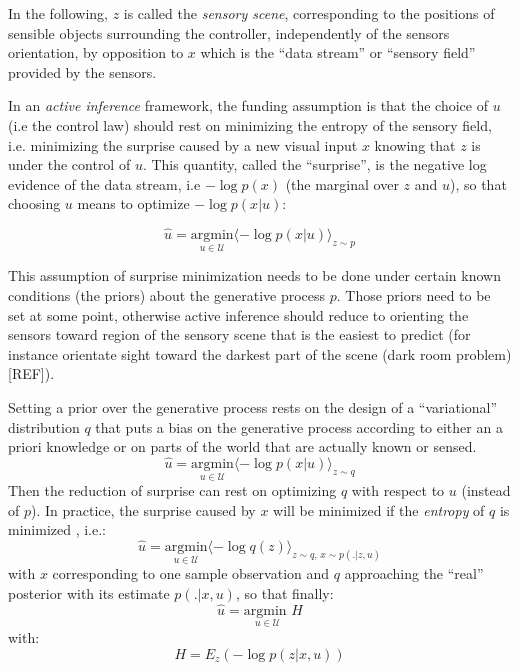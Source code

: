 \documentclass[12pt,twoside,openright]{article}
\begin{document}
	In the following, $z$ is called the \emph{sensory scene}, corresponding to the positions of sensible objects surrounding the controller, independently of the sensors orientation, by opposition to $x$ which is the ``data stream'' or ``sensory field'' provided by the sensors.
	
	In an \emph{active inference} framework, the funding assumption is that the choice of $u$ (i.e the control law) should rest on minimizing the entropy of the sensory field, i.e. minimizing the surprise caused by a new visual input $x$ knowing that $z$ is under the control of $u$. This quantity, called the ``surprise'', is the negative log evidence of the data stream, i.e $-\log p(x)$ (the marginal over $z$ and $u$), so that choosing $u$ means to optimize $-\log p(x|u)$:
	
	$$ \hat{u} = \underset{u \in \mathcal{U}}{\text{argmin}} \langle -\log p(x|u)\rangle_{z\sim p}$$
	
	{\color{blue} This assumption of surprise minimization needs to be done under certain known conditions (the priors) about the generative process $p$. Those priors need to be set at some point, otherwise active inference should reduce to orienting the sensors toward region of the sensory scene that is the easiest to predict  (for instance orientate sight toward the darkest  part of the scene (dark room problem) [REF]). }
	
	
	Setting a prior over the generative process rests on the design of a ``variational'' distribution $q$ that puts a bias on the generative process according to either an a priori knowledge or on parts of the world that are actually known or sensed.
	$$ \hat{u} = \underset{u \in \mathcal{U}}{\text{argmin}} \langle -\log p(x|u)\rangle_{z\sim q}$$ 
	Then the reduction of surprise can rest on optimizing $q$ with respect to $u$ (instead of $p$).  In practice, the surprise caused by $x$ will be minimized if the \emph{entropy} of $q$ is minimized \cite{friston2012perceptions}, i.e.:
	$$ \hat{u} = \underset{u \in \mathcal{U}}{\text{argmin}} \langle -\log q(z)\rangle_{z \sim q\text{, }x\sim p(.|z,u)}$$ 
	with $x$ corresponding to one sample observation and $q$ approaching the ``real'' posterior with its estimate $p(.|x,u)$, so that finally:
	$$\hat{u} = \underset{u \in \mathcal{U}}{\text{argmin }} H$$ 
	with:
	$$H = E_z(-\log p(z|x,u))$$
	
\end{document}
